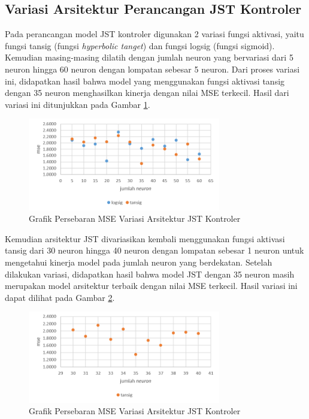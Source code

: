 \subsection{Variasi Arsitektur Perancangan JST Kontroler}

Pada perancangan model JST kontroler digunakan 2 variasi fungsi aktivasi, yaitu fungsi tansig (fungsi \textit{hyperbolic tanget}) dan fungsi logsig (fungsi sigmoid). Kemudian masing-masing dilatih dengan jumlah neuron yang bervariasi dari 5 neuron hingga 60 neuron dengan lompatan sebesar 5 neuron. Dari proses variasi ini, didapatkan hasil bahwa model yang menggunakan fungsi aktivasi tansig dengan 35 neuron menghasilkan kinerja dengan nilai MSE terkecil. Hasil dari variasi ini ditunjukkan pada Gambar \ref{fig:5:ActivationVariation}.

\begin{figure}[!h]
	\centering
	\includegraphics[width=0.75\textwidth]{figures/ActivationVariation}
	\caption{Grafik Persebaran MSE Variasi Arsitektur JST Kontroler}
	\label{fig:5:ActivationVariation}
\end{figure}

Kemudian arsitektur JST divariasikan kembali menggunakan fungsi aktivasi tansig dari 30 neuron hingga 40 neuron dengan lompatan sebesar 1 neuron untuk mengetahui kinerja model pada jumlah neuron yang berdekatan. Setelah dilakukan variasi, didapatkan hasil bahwa model JST dengan 35 neuron masih merupakan model arsitektur terbaik dengan nilai MSE terkecil. Hasil variasi ini dapat dilihat pada Gambar \ref{fig:5:NeuronVariation}.

\begin{figure}[!h]
	\centering
	\includegraphics[width=0.75\textwidth]{figures/NeuronVariation}
	\caption{Grafik Persebaran MSE Variasi Arsitektur JST Kontroler}
	\label{fig:5:NeuronVariation}
\end{figure}

